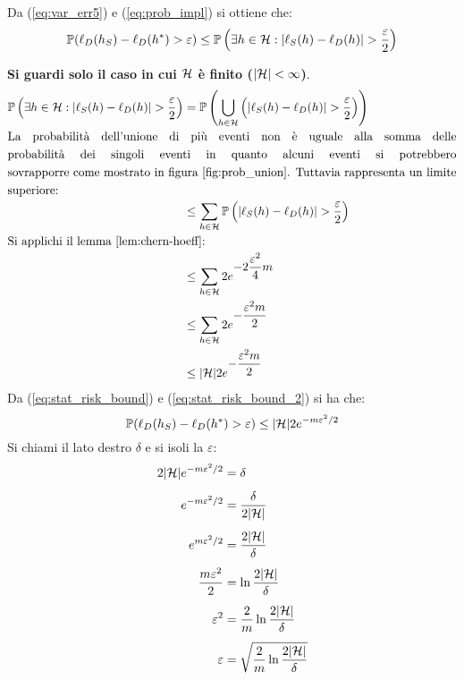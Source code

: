 Da (\ref{eq:var_err5}) e (\ref{eq:prob_impl}) si ottiene che:
\begin{equation}
    \Prob(\ell_D(h_S)-\ell_D(h^*)>\varepsilon) \leq
    \Prob\left(\exists h \in \Hpred : |\ell_S(h)-\ell_D(h)|>\frac{\varepsilon}{2}
    \right) \label{eq:stat_risk_bound}
\end{equation}

\begin{figure}[ht]
    \centering
    
    \caption{\label{fig:prob_union}}
\end{figure}

\textbf{Si guardi solo il caso in cui $\mathcal{H}$ è finito ($|\mathcal{H}|<\infty$)}.
\begin{align}
\Prob\left(\exists h \in \Hpred : |\ell_S(h)-\ell_D(h)|>\frac{\varepsilon}{2}\right)
&= \Prob\left(\bigcup_{h\in\Hpred} \left(|\ell_S(h)-\ell_D(h)|>
\frac{\varepsilon}{2}\right)\right)\notag\\
\multispan2{La probabilità dell'unione di più eventi non è uguale alla somma delle}\notag\\
\multispan2{probabilità dei singoli eventi in quanto alcuni eventi si potrebbero}\notag\\
\multispan2{sovrapporre come mostrato in figura \ref{fig:prob_union}. 
Tuttavia rappresenta un limite}\notag\\
\multispan2{superiore:\hfill}\notag\\
&\leq \sum_{h\in\Hpred}\Prob\left(|\ell_S(h)-\ell_D(h)|>\frac{\varepsilon}{2}\right)\notag\\
\multispan2{Si applichi il lemma \ref{lem:chern-hoeff}:\hfill}\notag\\
&\leq \sum_{h\in\Hpred}  2e^{\displaystyle-2\frac{\varepsilon^2}{4}m}\notag\\
&\leq \sum_{h\in\Hpred}  2e^{\displaystyle-\frac{\varepsilon^2m}{2}}\notag\\
&\leq |\Hpred|  2e^{\displaystyle-\frac{\varepsilon^2m}{2}}\label{eq:stat_risk_bound_2}
\end{align}
Da (\ref{eq:stat_risk_bound}) e (\ref{eq:stat_risk_bound_2}) si ha che:
\begin{equation}
\mathbb{P}(\ell_D(h_S)-\ell_D(h^*)>\varepsilon) \leq
|\mathcal{H}|2e^{-m\varepsilon^2/2}
\label{eq:stat_risk_bound_3}
\end{equation}
Si chiami il lato destro $\delta$ e si isoli la $\varepsilon$:
\begin{align}
    2|\mathcal{H}|e^{-m\varepsilon^2/2} &= \delta\label{eq:stat_risk_bound_4}\\[.15cm]
    e^{-m\varepsilon^2/2} &= \frac{\delta}{2|\mathcal{H}|}\notag\\[.15cm]
    e^{m\varepsilon^2/2} &= \frac{2|\mathcal{H}|}{\delta}\notag\\[.15cm]
    \frac{m\varepsilon^2}{2} &= \ln{\frac{2|\ensuremath{\mathcal{H}}|}{\delta}}\notag\\[.15cm]
    \varepsilon^2 &= \frac{2}{m}\ln{\frac{2|\ensuremath{\mathcal{H}}|}{\delta}}\notag\\[.15cm]
    \varepsilon &= \sqrt{\frac{2}{m}\ln{\frac{2|\ensuremath{\mathcal{H}}|}{\delta}}}\label{eq:stat_risk_bound_5}
\end{align}
